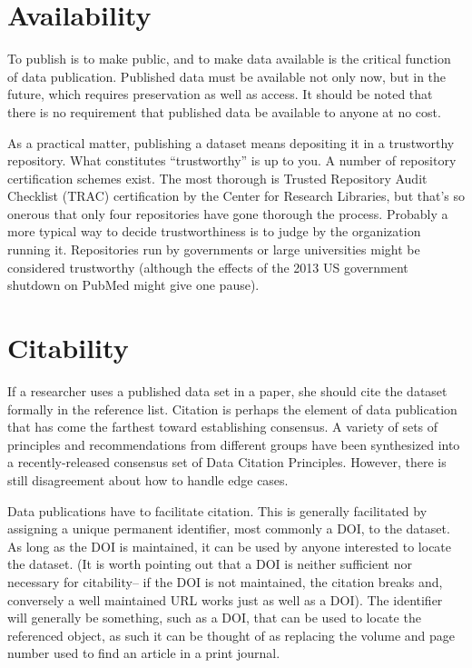 \documentclass[10pt,a4paper,twocolumn]{article}
\begin{document}

\section*{Availability}\label{availability}

To publish is to make public, and to make data available is the critical function of data publication. 
Published data must be available not only now, but in the future, which requires preservation as well as access. 
It should be noted that there is no requirement that published data be available to anyone at no cost.

As a practical matter, publishing a dataset means depositing it in a trustworthy repository. 
What constitutes ``trustworthy'' is up to you. 
A number of repository certification schemes exist. The most thorough is Trusted Repository Audit Checklist (TRAC)\cite{trac_2007} certification by the Center for Research Libraries, but that's so onerous that only four repositories have gone thorough the process. 
Probably a more typical way to decide trustworthiness is to judge by the organization running it. 
Repositories run by governments or large universities might be considered trustworthy (although the effects of the 2013 US government shutdown on PubMed might give one pause).


\section*{Citability}\label{citability}

If a researcher uses a published data set in a paper, she should cite the dataset formally in the reference list. 
Citation is perhaps the element of data publication that has come the farthest toward establishing consensus.
A variety of sets of principles and recommendations from different groups have been synthesized into a recently-released consensus set of Data Citation Principles. \cite{force11_data_2014} 
However, there is still disagreement about how to handle edge cases.

Data publications have to facilitate citation. 
This is generally facilitated by assigning a unique permanent identifier, most commonly a DOI, to the dataset. 
As long as the DOI is maintained, it can be used by anyone interested to locate the dataset. 
(It is worth pointing out that a DOI is neither sufficient nor necessary for citability-- if the DOI is not maintained, the citation breaks and, conversely a well maintained URL works just as well as a DOI). 
The identifier will generally be something, such as a DOI, that can be used to locate the referenced object, as such it can be thought of as replacing the volume and page number used to find an article in a print journal.
\end{document}
